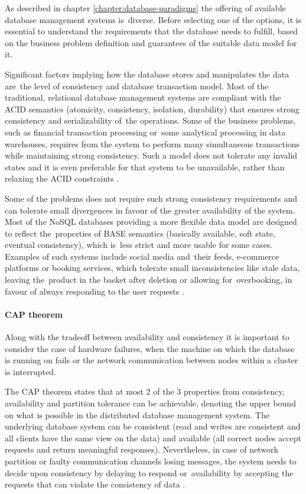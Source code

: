 As described in chapter \ref{chapter:database-paradigms} the offering of available database management systems is~diverse. Before selecting one of the options, it is essential to understand the requirements that the database needs to fulfill, based on the business problem definition and guarantees of the suitable data model for it. 

Significant factors implying how the database stores and manipulates the data are~the level of consistency and database transaction model. Most of the traditional, relational database management systems are compliant with the ACID semantics (atomicity, consistency, isolation, durability) that ensures strong consistency and serializability of~the operations. Some of the business problems, such as financial transaction processing or~some analytical processing in data warehouses, requires from the system to perform many simultaneous transactions while maintaining strong consistency. Such a model does not tolerate any invalid states and it is even preferable for that system to be unavailable, rather than relaxing the ACID constraints \cite{PerspectivesOnArchitectureEvolution}.

Some of the problems does not require such strong consistency requirements and can tolerate small divergences in favour of the greater availability of the system. Most of the NoSQL databases providing a more flexible data model are designed to reflect the~properties of BASE semantics (basically available, soft state, eventual consistency), which is~less strict and more usable for some cases. Examples of such systems include social media and~their feeds, e-commerce platforms or booking services, which tolerate small inconsistencies like stale data, leaving the~product in the basket after deletion or allowing for~overbooking, in favour of always responding to the user requests \cite{NoSQLDatabaseSystemsSurveyDecisionGuidance}.

\paragraph{CAP theorem}

Along with the tradeoff between availability and consistency it is important to consider the case of hardware failures, when the machine on which the database is running on fails or the network communication between nodes within a cluster is interrupted. 

The CAP theorem \cite{CAPTheorem} states that at most 2 of the 3 properties from consistency, availability and partition tolerance can be achievable, denoting the upper bound on what is possible in the distributed database management system. The underlying database system can be consistent (read and writes are consistent and all clients have the same view on the data) and available (all correct nodes accept requests and return meaningful responses). Nevertheless, in case of network partition or faulty communication channels losing messages, the system needs to decide upon consistency by delaying to respond or~availability by accepting the requests that can violate the consistency of data \cite{PerspectivesOnArchitectureEvolution}.

